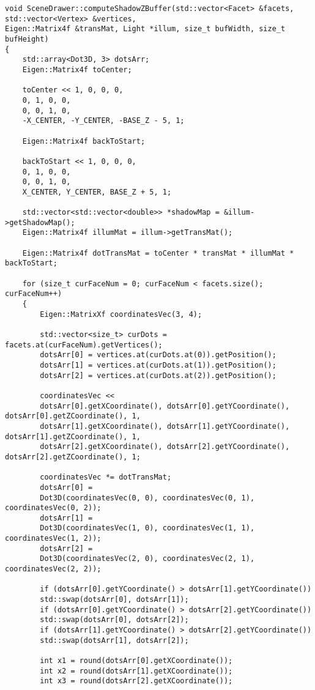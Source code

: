 \begin{center}
	\captionsetup{justification=raggedright,singlelinecheck=off}
	\begin{lstlisting}[caption=Реализация алгоритма Z-буфера для теней]
void SceneDrawer::computeShadowZBuffer(std::vector<Facet> &facets, std::vector<Vertex> &vertices,
Eigen::Matrix4f &transMat, Light *illum, size_t bufWidth, size_t bufHeight)
{
	std::array<Dot3D, 3> dotsArr;
	Eigen::Matrix4f toCenter;
	
	toCenter << 1, 0, 0, 0,
	0, 1, 0, 0,
	0, 0, 1, 0,
	-X_CENTER, -Y_CENTER, -BASE_Z - 5, 1;
	
	Eigen::Matrix4f backToStart;
	
	backToStart << 1, 0, 0, 0,
	0, 1, 0, 0,
	0, 0, 1, 0,
	X_CENTER, Y_CENTER, BASE_Z + 5, 1;
	
	std::vector<std::vector<double>> *shadowMap = &illum->getShadowMap();
	Eigen::Matrix4f illumMat = illum->getTransMat();
	
	Eigen::Matrix4f dotTransMat = toCenter * transMat * illumMat * backToStart;
	
	for (size_t curFaceNum = 0; curFaceNum < facets.size(); curFaceNum++)
	{
		Eigen::MatrixXf coordinatesVec(3, 4);
		
		std::vector<size_t> curDots = facets.at(curFaceNum).getVertices();
		dotsArr[0] = vertices.at(curDots.at(0)).getPosition();
		dotsArr[1] = vertices.at(curDots.at(1)).getPosition();
		dotsArr[2] = vertices.at(curDots.at(2)).getPosition();
		
		coordinatesVec <<
		dotsArr[0].getXCoordinate(), dotsArr[0].getYCoordinate(), dotsArr[0].getZCoordinate(), 1,
		dotsArr[1].getXCoordinate(), dotsArr[1].getYCoordinate(), dotsArr[1].getZCoordinate(), 1,
		dotsArr[2].getXCoordinate(), dotsArr[2].getYCoordinate(), dotsArr[2].getZCoordinate(), 1;
		
		coordinatesVec *= dotTransMat;
		dotsArr[0] =
		Dot3D(coordinatesVec(0, 0), coordinatesVec(0, 1), coordinatesVec(0, 2));
		dotsArr[1] =
		Dot3D(coordinatesVec(1, 0), coordinatesVec(1, 1), coordinatesVec(1, 2));
		dotsArr[2] =
		Dot3D(coordinatesVec(2, 0), coordinatesVec(2, 1), coordinatesVec(2, 2));
		
		if (dotsArr[0].getYCoordinate() > dotsArr[1].getYCoordinate())
		std::swap(dotsArr[0], dotsArr[1]);
		if (dotsArr[0].getYCoordinate() > dotsArr[2].getYCoordinate())
		std::swap(dotsArr[0], dotsArr[2]);
		if (dotsArr[1].getYCoordinate() > dotsArr[2].getYCoordinate())
		std::swap(dotsArr[1], dotsArr[2]);
		
		int x1 = round(dotsArr[0].getXCoordinate());
		int x2 = round(dotsArr[1].getXCoordinate());
		int x3 = round(dotsArr[2].getXCoordinate());
		

\end{lstlisting}
\end{center}
